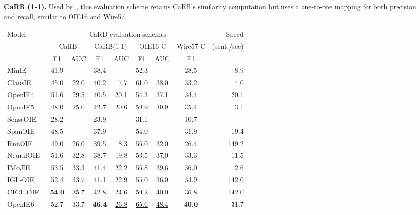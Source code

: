 \documentclass[letterpaper]{article} \usepackage{aaai22}  \usepackage{times}  \usepackage{helvet}  \usepackage{courier}  \usepackage[hyphens]{url}  \usepackage{graphicx} \usepackage{placeins}
\begin{document}
\textbf{CaRB (1-1).} Used by~\citet{kolluru2020openie6}, this evaluation scheme retains CaRB's similarity computation but uses a one-to-one mapping for both precision and recall, similar to OIE16 and Wire57.

\begin{table*}[t]
    \centering\small
    \setlength{\tabcolsep}{7pt}
    \begin{tabular}{l|cc|cc|cc|c|r} \toprule
        \multirow{3}{*}{Model} & \multicolumn{7}{|c|}{CaRB evaluation schemes} & Speed \\
        \cline{2-8} 
        & \multicolumn{2}{c|}{CaRB} & \multicolumn{2}{c|}{CaRB(1-1)} & \multicolumn{2}{c|}{OIE16-C} & \multicolumn{1}{c|}{Wire57-C} & \multirow{2}{*}{(sent./sec)} \\
        \cline{2-8}
           & {F1} & {AUC} & {F1} & {AUC} & {F1} & {AUC} & {F1} &  \\ \hline
        MinIE~\cite{gashteovski2017minie}  & 41.9 & - & 38.4 & - & 52.3 & - & 28.5 & 8.9 \\
        ClausIE~\cite{del2013clausie}  & 45.0 & 22.0 & 40.2 & 17.7 & 61.0 & 38.0 & 33.2 & 4.0 \\
        OpenIE4~\cite{christensen2011analysis}  & 51.6 & 29.5 & 40.5 & 20.1 & 54.3 & 37.1 & 34.4 & 20.1 \\
        OpenIE5~\cite{saha2017bootstrapping,saha2018open}  & 48.0 & 25.0 & 42.7 & 20.6 & 59.9 & 39.9 & 35.4 & 3.1\\ \hline
    SenseOIE~\cite{roy-etal-2019-supervising}  & 28.2 & - & 23.9 & - & 31.1 & - & 10.7 & - \\
        SpanOIE~\cite{zhan2020span}  & 48.5 & - & 37.9 & - & 54.0 & - & 31.9 & 19.4 \\
        RnnOIE~\cite{stanovsky-etal-2018-supervised}  & 49.0 & 26.0 & 39.5 & 18.3 & 56.0 & 32.0 & 26.4 & \underline{149.2} \\
        NeuralOIE~\cite{cui-etal-2018-neural}  & 51.6 & 32.8 & 38.7 & 19.8 & 53.5 & 37.0 & 33.3 & 11.5\\ \hline
        IMoJIE~\cite{kolluru2020imojie}  & \underline{53.5} & 33.3 & 41.4 & 22.2 & 56.8 & 39.6 & 36.0 & 2.6 \\
        IGL-OIE~\cite{kolluru2020openie6} & 52.4 & 33.7 & 41.1 & 22.9 & 55.0 & 36.0 & 34.9 & 142.0 \\
        CIGL-OIE~\cite{kolluru2020openie6} & \textbf{54.0} & \underline{35.7} & 42.8 & 24.6 & 59.2 & 40.0 & 36.8 & 142.0 \\
        {OpenIE6}~\cite{kolluru2020openie6} & 52.7 & 33.7 & \textbf{46.4} & \underline{26.8} & \underline{65.6} & \underline{48.4} & \textbf{40.0} & 31.7 \\ \hline 

\end{tabular}
\end{table*}
\end{document}
